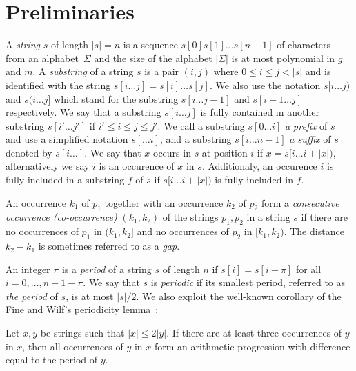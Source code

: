  
\section{Preliminaries}
\label{pmgapped:sec:prelim}
A \emph{string} $s$ of length $|s| = n$ is a sequence $s[0]s[1]\dots s[n-1]$ of characters from an alphabet~$\Sigma$ and the size of the alphabet $|\Sigma|$ is at most polynomial in $g$ and $m$.
A \emph{substring} of a string $s$ is a pair $(i,j)$ where  $0 \le i \le j < |s|$ and is identified with the string $s[i \dots j]=s[i] \dots s[j]$. We also use the notation $s[i \dots j)$ and $s(i \dots j]$ which stand for the substring $s[i \dots j-1]$ and $s[i-1 \dots j]$ respectively.
We say that a substring $s[i \dots j]$ is fully contained in another substring $s[i' \dots j']$ if $i' \le i \le j \le j'$. 
We call a substring $s[0 \dots i]$ \emph{a prefix} of $s$ and use a simplified notation $s[\dots i]$, and a substring $s[i \dots n-1]$ \emph{a suffix} of $s$ denoted by $s[i \dots]$. 
We say that $x$ occurs in $s$ at position $i$ if $x = s[i \dots i+|x|)$, alternatively we say $i$ is an occurence of $x$ in $s$.
Additionaly, an occurence $i$ is fully included in a substring $f$ of $s$ if $s[i \dots i+|x|)$ is fully included in $f$.
%

An occurrence $k_1$ of $p_1$ together with an occurrence $k_2$ of $p_2$ form a \emph{consecutive occurrence (co-occurrence)} $(k_1,k_2)$ of the strings $p_1,p_2$ in a string $s$ if there are no occurrences of $p_1$ in $(k_1,k_2]$ and no occurrences of $p_2$ in $[k_1,k_2)$. The distance $k_2-k_1$ is sometimes referred to as a \emph{gap}.

An integer $\pi$ is a \emph{period} of a string $s$ of length $n$ if $s[i]=s[i+\pi]$ for all $i=0,\dots, n-1-\pi$. We say that $s$ is \emph{periodic} if its smallest period, referred to as \emph{the period} of $s$, is at most $|s|/2$. We also exploit the well-known corollary of the Fine and Wilf's periodicity lemma~\cite{Fine1965}:


\begin{corollary}\label{pmgapped:cor:arithmetic_progression}
Let $x, y$ be strings such that $|x|\leq 2|y|$. If there are at least three occurrences of $y$ in $x$, then all occurrences of $y$ in $x$ form an arithmetic progression with difference equal to the period of $y$. 
\end{corollary}


